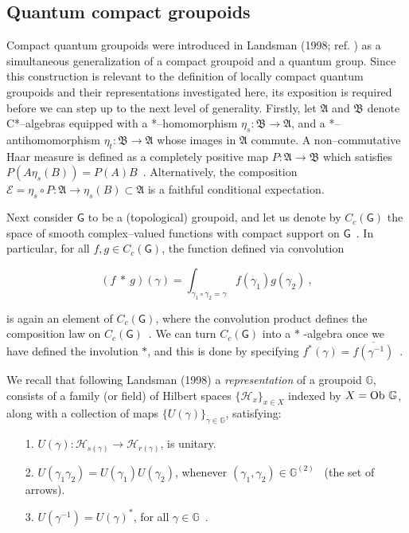 \documentclass[12pt]{article}
\theoremstyle{plain}
\theoremstyle{definition}
\numberwithin{equation}{section}
\newcommand{\E}{\mathcal E}
\newcommand{\grp}{{\mathbb G}}
\newcommand{\ob}{{\rm Ob}}
\newcommand{\lra}{{\longrightarrow}}
\begin{document}
\subsection{Quantum compact groupoids}

Compact quantum groupoids were introduced in Landsman (1998; ref. \cite{L98}) as a
simultaneous generalization of a compact groupoid and a quantum group. Since this construction is relevant to the definition of locally compact quantum groupoids and their representations investigated here, its  exposition is required before we can step up to the next level of generality. Firstly, let $\mathfrak A$ and $\mathfrak B$ denote C*--algebras equipped with a *--homomorphism $\eta_s : \mathfrak B \lra \mathfrak A$, and a *--antihomomorphism $\eta_t : \mathfrak B \lra \mathfrak A$ whose images in $\mathfrak A$
commute. A non--commutative Haar measure is defined as a completely
positive map $P: \mathfrak A \lra \mathfrak B$ which satisfies
$P(A \eta_s (B)) = P(A) B$~. Alternatively, the composition $\E = \eta_s \circ P : \mathfrak A \lra \eta_s (B) \subset \mathfrak A$ is a faithful conditional expectation.

Next consider $\mathsf{G}$ to be a (topological) groupoid, and let us denote by $C_c(\mathsf{G})$ the space of smooth complex--valued functions with compact support on $\mathsf{G}$~. In particular, for all $f,g \in C_c(\mathsf{G})$, the
function defined via convolution

\begin{equation} (f ~*~g)(\gamma)
= \int_{\gamma_1 \circ \gamma_2 = \gamma} f(\gamma_1) g
(\gamma_2)~,
\end{equation}

is again an element of $C_c(\mathsf{G})$, where the convolution product defines the composition law on $C_c(\mathsf{G})$~. We can turn $C_c(\mathsf{G})$ into a $*$ -algebra once we have defined the involution
$*$, and this is done by specifying $f^*(\gamma) = \overline{f(\gamma^{-1})}$~. 

 We recall that following Landsman (1998) a \emph{representation} of a groupoid $\grp$, consists of a
family (or field) of Hilbert spaces $\{\mathcal H_x \}_{x \in X}$
indexed by $X = \ob~ \grp$, along with a collection of maps $\{
U(\gamma)\}_{\gamma \in \grp}$, satisfying:
\begin{itemize}
\item[1.]
$U(\gamma) : \mathcal H_{s(\gamma)} \lra  \mathcal H_{r(\gamma)}$,
is unitary.
\item[2.]
$U(\gamma_1 \gamma_2) = U(\gamma_1) U( \gamma_2)$, whenever
$(\gamma_1, \gamma_2) \in \grp^{(2)}$~ (the set of arrows).
\item[3.]
$U(\gamma^{-1}) = U(\gamma)^*$, for all $\gamma \in \grp$~.
\end{itemize}
\end{document}

